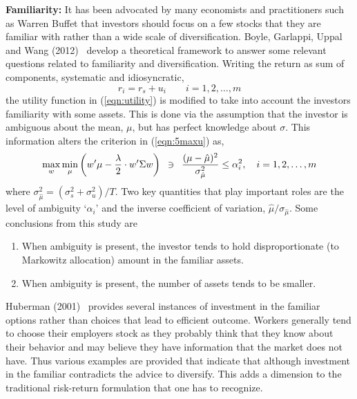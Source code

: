 \noindent\textbf{Familiarity:} It has been advocated by many economists and practitioners such as Warren Buffet that investors should focus on a few stocks that they are familiar with rather than a wide scale of diversification. Boyle, Garlappi, Uppal and Wang (2012)~\cite{bguwang} develop a theoretical framework to answer some relevant questions related to familiarity and diversification. Writing the return as sum of components, systematic and idiosyncratic,
	\begin{equation}\label{eqn:rirsui}
	r_i = r_s + u_i \quad\quad i=1,2,\ldots,m
	\end{equation}
the utility function in (\ref{eqn:utility}) is modified to take into account the investors familiarity with some assets. This is done via the assumption that the investor is ambiguous about the mean, $\mu$, but has perfect knowledge about $\sigma$. This information alters the criterion in (\ref{eqn:5maxu}) as,
	\begin{equation}\label{eqn:maxminwmu}
	\max_w \min_\mu \left(w'\mu - \frac{\lambda}{2} \cdot w' \Sigma w \right)\enskip \ni \enskip\dfrac{(\mu-\hat{\mu})^2}{\sigma_{\hat{\mu}}^2} \leq \alpha_i^2, \quad i=1,2,\ldots,m
	\end{equation}
where $\sigma_{\hat{\mu}}^2= (\sigma_s^2+\sigma_u^2)/T$. Two key quantities that play important roles are the level of ambiguity `$\alpha_i$' and the inverse coefficient of variation, $\hat{\mu}/\sigma_{\hat{\mu}}$. Some conclusions from this study are
\begin{enumerate}[--]
\item When ambiguity is present, the investor tends to hold disproportionate (to Markowitz allocation) amount in the familiar assets.
\item When ambiguity is present, the number of assets tends to be smaller.
\end{enumerate}


Huberman (2001)~\cite{Hub} provides several instances of investment in the familiar options rather than choices that lead to efficient outcome. Workers generally tend to choose their employers stock as they probably think that they know about their behavior and may believe they have information that the market does not have. Thus various examples are provided that indicate that although investment in the familiar contradicts the advice to diversify. This adds a dimension to the traditional risk-return formulation that one has to recognize. \\


